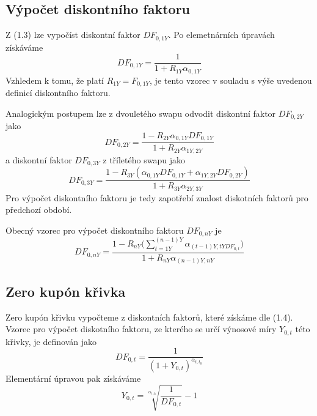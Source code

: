 \documentclass[a4paper]{book}
\begin{document}
\subsection{Výpočet diskontního faktoru}

Z (1.3) lze vypočíst diskontní faktor $DF_{0, 1Y}$. Po elemetnárních úpravách získáváme
\begin{equation*}
DF_{0, 1Y} = \frac{1}{1 + R_{1Y} \alpha_{0,1Y}}
\end{equation*}
Vzhledem k tomu, že platí $R_{1Y} = F_{0,1Y}$, je tento vzorec v souladu s výše uvedenou definicí diskontního faktoru.

Analogickým postupem lze z dvouletého swapu odvodit diskontní faktor $DF_{0,2Y}$ jako
\begin{equation*}
DF_{0,2Y} = \frac{1 - R_{2Y} \alpha_{0,1Y}DF_{0,1Y}}{1 + R_{2Y} \alpha_{1Y, 2Y}}
\end{equation*}
a diskontní faktor $DF_{0,3Y}$ z tříletého swapu jako
\begin{equation*}
DF_{0,3Y} = \frac{1 - R_{3Y}(\alpha_{0,1Y}DF_{0,1Y} + \alpha_{1Y,2Y}DF_{0,2Y})}{1 + R_{3Y} \alpha_{2Y, 3Y}}
\end{equation*}
Pro výpočet diskontního faktoru je tedy zapotřebí znalost diskotních faktorů pro předchozí období.

Obecný vzorec pro výpočet diskontního faktoru $DF_{0,nY}$ je
\begin{equation}
DF_{0,nY} = \frac{1 - R_{nY} \bigg( \sum_{t = 1Y}^{(n-1)Y} \alpha_{(t-1)Y,tY DF_{0,t}} \bigg)}{1 + R_{nY} \alpha_{(n-1)Y,nY}}
\end{equation}

\subsection{Zero kupón křivka}

Zero kupón křivku vypočteme z diskontních faktorů, které získáme dle (1.4). Vzorec pro výpočet diskotního faktoru, ze kterého se určí výnosové míry $Y_{0,t}$ této křivky, je definován jako
\begin{equation*}
DF_{0,t} = \frac{1}{(1 + Y_{0,t})^{\alpha_{t, t_0}}}
\end{equation*}
Elementární úpravou pak získáváme
\begin{equation*}
Y_{0,t} = \sqrt[\alpha_{t, t_0}]{\frac{1}{DF_{0,t}}} - 1
\end{equation*}
\end{document}
